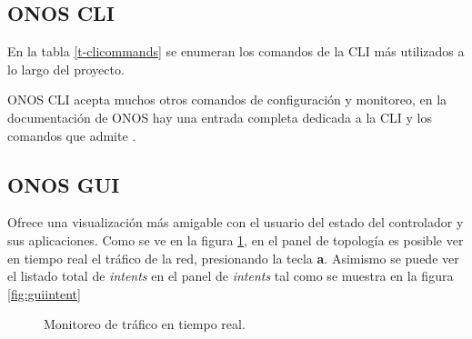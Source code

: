 \subsection{ONOS CLI}
En la tabla \ref{t-clicommands} se enumeran los comandos de la CLI más utilizados a lo largo del proyecto.
\begin{table}[th]
    \centering
    \caption{Comandos de la CLI de onos}
    \label{t-clicommands}
\end{table}
ONOS CLI acepta muchos otros comandos de configuración y monitoreo, en la documentación de ONOS hay una entrada completa dedicada a la CLI y los comandos que admite \parencite{onoscli}.

\subsection{ONOS GUI}
Ofrece una visualización más amigable con el usuario del estado del controlador y sus aplicaciones. Como se ve en la figura \ref{fig:guimonitor}, en el panel de topología es posible ver en tiempo real el tráfico de la red, presionando la tecla \textbf{a}. Asimismo se puede ver el listado total de \textit{intents} en el panel de \textit{intents} tal como se muestra en la figura \ref{fig:guiintent}

\begin{figure}[th]
	\centering 
	\caption[Monitoreo de tráfico en tiempo real]{Monitoreo de tráfico en tiempo real.}
	\label{fig:guimonitor}
\end{figure}

